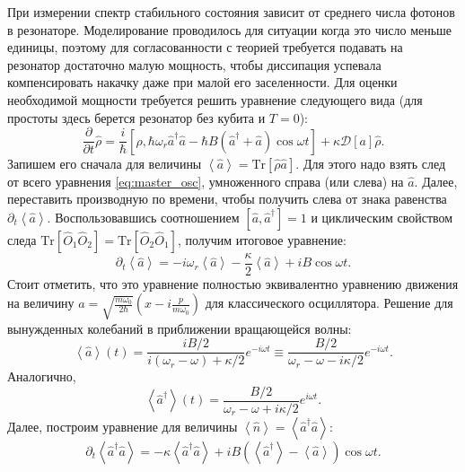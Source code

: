 \documentclass[12pt, twoside]{report}
\newcommand{\Tr}[1]{\text{Tr}\left[#1\right]}
\newcommand{\rbrkt}[1]{\left( #1 \right)}
\newcommand{\sbrkt}[1]{\left[ #1 \right]}
\numberwithin{equation}{section}
\numberwithin{figure}{section}
\begin{document}
При измерении спектр стабильного состояния зависит от среднего числа фотонов в резонаторе. Моделирование проводилось для ситуации когда это число меньше единицы, поэтому для согласованности с теорией требуется подавать на резонатор достаточно малую мощность, чтобы диссипация успевала компенсировать накачку даже при малой его заселенности. Для оценки необходимой мощности требуется решить уравнение следующего вида (для простоты здесь берется резонатор без кубита и $T=0$):
\begin{equation}
\frac{\partial}{\partial t} \hat \rho = \frac{i}{\hbar}\sbrkt{\hat \rho, \hbar \omega_r \hat a^\dag \hat a - \hbar B (\hat a^\dag + \hat a) \cos \omega t}  + \kappa \mathcal{D}[a]\hat \rho.
\label{eq:master_osc}
\end{equation}
Запишем его сначала для величины $\left< \hat a \right> = \Tr{\hat \rho \hat a}$. Для этого надо взять след от всего уравнения \eqref{eq:master_osc}, умноженного справа (или слева) на $\hat a$. Далее, переставить производную	по времени, чтобы получить слева от знака равенства $\partial_t \left< \hat a \right>$. Воспользовавшись соотношением $\sbrkt{\hat a, \hat a^\dag} = 1$ и циклическим свойством следа $\Tr{\hat O_1 \hat O_2} = \Tr{\hat O_2 \hat O_1}$, получим итоговое уравнение:
\begin{equation*}
\partial_t \left< \hat a \right> = - i\omega_r \left< \hat a \right> - \frac{\kappa}{2} \left< \hat a \right> + i B \cos \omega t.
\end{equation*}
Стоит отметить, что это уравнение полностью эквивалентно уравнению движения на величину $ a = \sqrt{\frac{m\omega_0}{2\hbar}} \rbrkt{x-i\frac{p}{m\omega_0}} $ для классического осциллятора\cite{thuneberg2013}. Решение для вынужденных колебаний в приближении вращающейся волны:
\begin{equation}
\left< \hat a \right> (t) = \frac{iB/2}{i(\omega_r-\omega) + \kappa/2}e^{-i\omega t} \equiv \frac{B/2}{\omega_r-\omega - i\kappa/2}e^{-i\omega t}.
\label{eq:a_ss}
\end{equation}
Аналогично,
\begin{equation}
\left< \hat a^\dag \right> (t) = \frac{B/2}{\omega_r-\omega + i\kappa/2}e^{i\omega t}.
\label{eq:a+_ss}
\end{equation}
Далее, построим уравнение для величины $\left< \hat n \right> = \left< \hat a^\dag \hat a \right>$:
\begin{equation*}
\partial_t \left< \hat a^\dag \hat a \right> = -\kappa \left< \hat a^\dag \hat a \right> + i B \rbrkt{\left< \hat a^\dag \right>  - \left< \hat a \right> } \cos \omega t.
\end{equation*}
\end{document}
